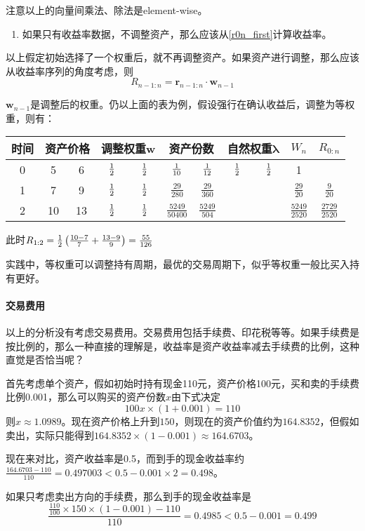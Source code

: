 注意以上的向量间乘法、除法是element-wise。

\begin{enumerate}
\item 如果只有收益率数据，不调整资产，那么应该从\eqref{r0n_first}计算收益率。
\end{enumerate}

以上假定初始选择了一个权重后，就不再调整资产。如果资产进行调整，那么应该从收益率序列的角度考虑，则
$$R_{n-1: n}=\bm{r}_{n-1: n}\cdot \bm{w}_{n-1}$$

$\bm{w}_{n-1}$是调整后的权重。仍以上面的表为例，假设强行在确认收益后，调整为等权重，则有：
\begin{longtable}{c cc cc cc cc cc}
	\toprule
	时间 & \multicolumn{2}{c}{资产价格} & \multicolumn{2}{c}{调整权重$\bm{w}$ } & \multicolumn{2}{c}{资产份数} & \multicolumn{2}{c}{自然权重$\bm{\lambda}$} &$W_n$ & $R_{0: n}$\\
	\midrule
	0 & 5& 6  & $\frac{1}{2}$ &$\frac{1}{2}$ &$\frac{1}{10}$& $\frac{1}{12}$&   $\frac{1}{2}$ &$\frac{1}{2}$ & 1 & \\
	1 & 7 & 9 &$\frac{1}{2}$ &$\frac{1}{2}$ &$\frac{29}{280}$ &$\frac{29}{360}$ &  &  & $\frac{29}{20}$&$\frac{9}{20}$ \\
	2& 10&13 &  $\frac{1}{2}$ &$\frac{1}{2}$ &$\frac{5249}{50400}$  &$\frac{5249}{504}$ &  & & $\frac{5249}{2520}$ & $\frac{2729}{2520}$\\
	\bottomrule
\end{longtable}
此时$R_{1:2}=\frac{1}{2}\left(\frac{10-7}{7}+\frac{13-9}{9}\right)=\frac{55}{126}$

实践中，等权重可以调整持有周期，最优的交易周期下，似乎等权重一般比买入持有更好。

\paragraph*{交易费用}以上的分析没有考虑交易费用。交易费用包括手续费、印花税等等。如果手续费是按比例的，那么一种直接的理解是，收益率是资产收益率减去手续费的比例，这种直觉是否恰当呢？

首先考虑单个资产，假如初始时持有现金110元，资产价格100元，买和卖的手续费比例0.001，那么可以购买的资产份数$x$由下式决定
$$100x\times(1+0.001)=110$$
则$x\approx 1.0989$。现在资产价格上升到$150$，则现在的资产价值约为$164.8352$，但假如卖出，实际只能得到$164.8352\times(1-0.001)\approx 164.6703$。

现在来对比，资产收益率是0.5，而到手的现金收益率约$\frac{164.6703-110}{110}=0.497003< 0.5-0.001\times 2=0.498$。

如果只考虑卖出方向的手续费，那么到手的现金收益率是
$$\frac{\frac{110}{100}\times 150\times(1-0.001)-110}{110}=0.4985<0.5-0.001=0.499$$

